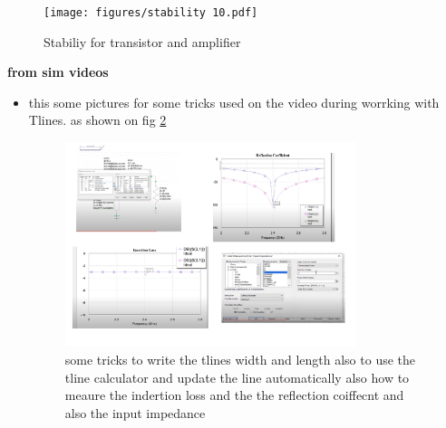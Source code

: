 \documentclass{article}
\begin{document}
\begin{itemize}
    \begin{figure}[H]
        \centering
        \texttt{[image: figures/stability 10.pdf]}
        \caption{Stabiliy for transistor and amplifier}
        \label{stability5}
    \end{figure}




\end{itemize}




\textbf{from sim videos}
\begin{itemize}
    \item this some pictures for some tricks used on the video during worrking with Tlines. as shown on fig \cref{simV1}
    \begin{figure}[H]
        \centering
        \includegraphics[width=0.8\textwidth]{figures/SimV1.pdf}
        \caption{some tricks to write the tlines width and length also to use the tline calculator and update the line automatically also how to meaure the indertion loss and the 
        the reflection coiffecnt and also the input impedance}
        \label{simV1}
    \end{figure}

\end{itemize}
\end{document}
